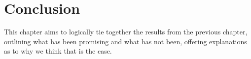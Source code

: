 \chapter{Conclusion}\label{ch:conclusion}
  This chapter aims to logically tie together the results from the previous
  chapter, outlining what has been promising and what has not been, offering
  explanations as to why we think that is the case.





